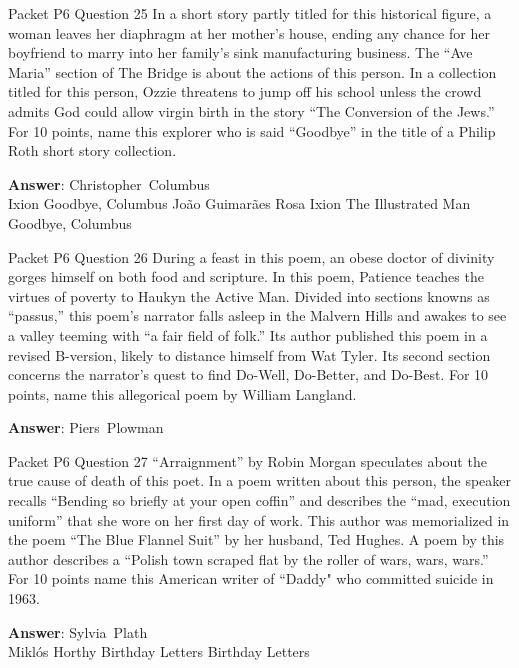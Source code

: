 \begin{frame}{Packet P6 Question 25}
In a short story partly titled for this historical figure, a woman leaves her diaphragm   at her mother's house, ending any chance for her boyfriend to marry into her family's sink manufacturing business. The “Ave Maria” section of The Bridge is about the actions of this person. In a collection titled for this person, Ozzie threatens to jump off his school unless the crowd admits God could allow virgin birth in the story “The Conversion of the Jews.” For 10 points, name this explorer who is said “Goodbye” in the title of a Philip Roth short   story collection.        

\textbf{Answer}: Christopher\ Columbus\\
 Ixion
 Goodbye, Columbus
 João Guimarães Rosa
 Ixion
 The Illustrated Man
 Goodbye, Columbus
\end{frame}

\begin{frame}{Packet P6 Question 26}
During a feast in this poem, an obese doctor of divinity gorges himself on both food and scripture. In this poem, Patience teaches the virtues of poverty to Haukyn the Active Man. Divided into sections knowns as “passus,”   this poem’s narrator falls asleep in the Malvern Hills and awakes   to see a valley   teeming with “a fair field of folk.” Its author published this poem in a revised B-version, likely to distance himself from Wat Tyler. Its second section concerns the narrator’s quest to find Do-Well, Do-Better, and Do-Best.   For 10 points, name this allegorical poem by William Langland.

\textbf{Answer}: Piers\ Plowman\\
\end{frame}

\begin{frame}{Packet P6 Question 27}
“Arraignment” by Robin   Morgan speculates about the true cause of death of this poet. In a poem written about this person, the speaker recalls “Bending so briefly at your open coffin” and describes the “mad, execution uniform” that she wore on her first day of work. This author was memorialized in the poem “The Blue Flannel Suit” by her husband,   Ted Hughes. A poem       by this author describes a “Polish town scraped flat by the roller of wars, wars, wars.” For 10 points name this American writer of “Daddy" who committed suicide in 1963.  

\textbf{Answer}: Sylvia\ Plath\\
 Miklós Horthy
 Birthday Letters
 Birthday Letters
\end{frame}

